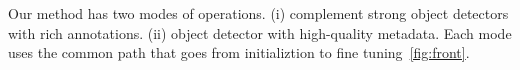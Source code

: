 % 
% 
% 
% 
% 
% 


Our method has two modes of operations. (i) complement strong object detectors
with rich annotations. (ii) object detector with high-quality metadata. Each
mode uses the common path that goes from initializtion to fine
tuning~\ref{fig:front}.  

